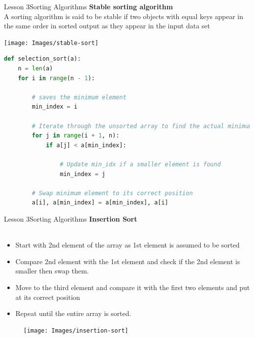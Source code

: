 \documentclass[aspectratio=1610]{beamer}
\begin{document}
\begin{frame}{Lesson 3}{Sorting Algorithms}
\LARGE
\textbf{Stable sorting algorithm}\\
A sorting algorithm is said to be stable if two objects with equal keys appear in
the same order in sorted output as they appear in the input data set
\begin{center}
\texttt{[image: Images/stable-sort]}
\end{center}
\end{frame}



\begin{frame}[fragile]
\begin{lstlisting}[language=Python]
def selection_sort(a):
    n = len(a)
    for i in range(n - 1):
      
        # saves the minimum element
        min_index = i
        
        # Iterate through the unsorted array to find the actual minimum
        for j in range(i + 1, n):
            if a[j] < a[min_index]:
              
                # Update min_idx if a smaller element is found
                min_index = j
                      
        # Swap minimum element to its correct position
        a[i], a[min_index] = a[min_index], a[i]
\end{lstlisting}
\end{frame}






\begin{frame}{Lesson 3}{Sorting Algorithms}
\LARGE
\textbf{Insertion Sort}\\~\\
\begin{minipage}{0.65\textwidth}
\Large
\begin{itemize}
    \item Start with 2nd element of the array as 1st element is assumed to be sorted
    \item Compare 2nd element with the 1st element and check if the 2nd element is smaller then swap them.
    \item Move to the third element and compare it with the first two elements and put at its correct position
    \item Repeat until the entire array is sorted.
\end{itemize}
  \end{minipage}
\begin{minipage}{.0\textwidth}
      \begin{figure}
        \texttt{[image: Images/insertion-sort]}
      \end{figure}
  \end{minipage}  
\end{frame}
\end{document}
